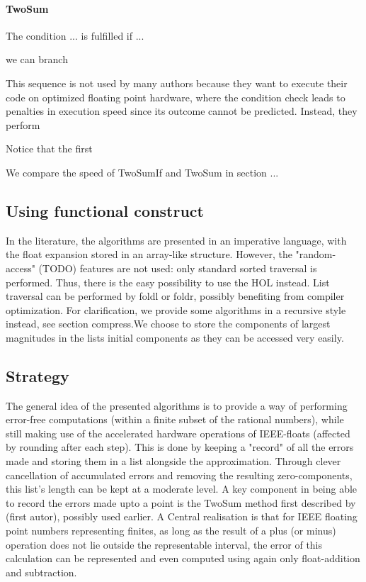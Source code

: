 \documentclass[11pt,a4paper]{article}
\begin{document}
\paragraph{TwoSum}

The condition ... is fulfilled if ...

we can branch 

This sequence is not used by many authors because they want to execute their code on optimized floating point hardware, where the condition check leads to penalties in execution speed since its outcome cannot be predicted. Instead, they perform

Notice that the first 

We compare the speed of TwoSumIf and TwoSum in section ...

\subsection{Using functional construct}
In the literature, the algorithms are presented in an imperative language, with the float expansion stored in an array-like structure. However, the "random-access" (TODO) features are not used: only standard sorted traversal is performed. Thus, there is the easy possibility to use the HOL
instead. List traversal can be performed by foldl or foldr, possibly benefiting from compiler optimization. For clarification, we provide some algorithms in a recursive style instead, see section compress.We choose to store the components of largest magnitudes in the lists initial components as they can be accessed very easily.
%
\subsection{Strategy}

The general idea of the presented algorithms is to provide a way of performing error-free computations (within a finite subset of the rational numbers), while still making use of the accelerated hardware operations of IEEE-floats (affected by rounding after each step). This is done by keeping a "record" of all the errors made and storing them in a list alongside the approximation. Through clever cancellation of accumulated errors and removing the resulting zero-components, this list's length can be kept at a moderate level.
A key component in being able to record the errors made upto a point is the TwoSum method first described by (first autor), possibly used earlier. A Central realisation is that for IEEE floating point numbers representing finites, as long as the result of a plus (or minus) operation does not lie outside the representable interval, the error of this calculation can be represented and even computed using again only float-addition and subtraction.
\end{document}
